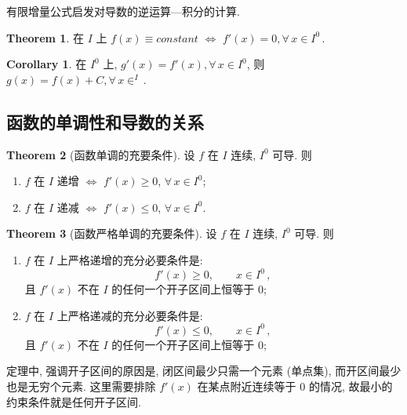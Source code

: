 \documentclass{book}
\newcommand{\bideduce}{\Longleftrightarrow}
\newcommand{\Any}{\forall\,}
\renewcommand{\ge}{\geqslant}
\renewcommand{\le}{\leqslant}
\numberwithin{equation}{section}
\numberwithin{figure}{section}
\theoremstyle{definition}
\newtheorem{theorem}{Theorem}[section]
\newtheorem{corollary}{Corollary}[section]
\begin{document}
有限增量公式启发对导数的逆运算---积分的计算.
\begin{theorem}
  在 $I$ 上 $f(x)\equiv \textit{constant}$ $\bideduce$ $f'(x)=0,\Any x\in I^0$\,.
\end{theorem}
\begin{corollary}
  在 $I^0$ 上, $g'(x)=f'(x),\Any x\in I^0$, 则 $g(x)=f(x)+C,\Any x\in^I$\,.
\end{corollary}
\subsection{函数的单调性和导数的关系}
\begin{theorem}[函数单调的充要条件]
  设 $f$ 在 $I$ 连续, $I^0$ 可导. 则
  \begin{enumerate}
    \item $f$ 在 $I$ 递增 $\bideduce$ $f'(x)\ge0$, $\Any x\in I^0$;
    \item $f$ 在 $I$ 递减 $\bideduce$ $f'(x)\le0$, $\Any x\in I^0$.
  \end{enumerate}
\end{theorem}
\begin{theorem}[函数严格单调的充要条件]
  设 $f$ 在 $I$ 连续, $I^0$ 可导. 则
  \begin{enumerate}
    \item $f$ 在 $I$ 上严格递增的充分必要条件是:
      \begin{equation*}
	f'(x)\ge0,\qquad x\in I^0\,,
      \end{equation*}
      且 $f'(x)$ 不在 $I$ 的任何一个开子区间上恒等于 0;
    \item $f$ 在 $I$ 上严格递减的充分必要条件是:
      \begin{equation*}
	f'(x)\le0,\qquad x\in I^0\,,
      \end{equation*}
      且 $f'(x)$ 不在 $I$ 的任何一个开子区间上恒等于 0;
  \end{enumerate}
\end{theorem}
定理中, 强调开子区间的原因是, 闭区间最少只需一个元素 (单点集), 而开区间最少也是无穷个元素. 这里需要排除 $f'(x)$ 在某点附近连续等于 0 的情况, 故最小的约束条件就是任何开子区间.
\end{document}
